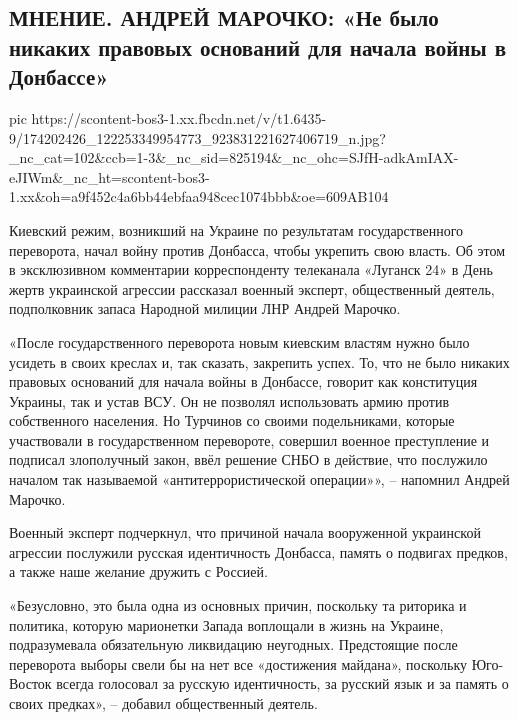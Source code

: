  
 
 
 
 

\subsection{МНЕНИЕ. АНДРЕЙ МАРОЧКО: «Не было никаких правовых оснований для начала войны в Донбассе»  }

\ifcmt
  pic https://scontent-bos3-1.xx.fbcdn.net/v/t1.6435-9/174202426_122253349954773_923831221627406719_n.jpg?_nc_cat=102&ccb=1-3&_nc_sid=825194&_nc_ohc=SJfH-adkAmIAX-eJIWm&_nc_ht=scontent-bos3-1.xx&oh=a9f452c4a6bb44ebfaa948cec1074bbb&oe=609AB104
\fi

Киевский режим, возникший на Украине по результатам государственного
переворота, начал войну против Донбасса, чтобы укрепить свою власть. Об этом в
эксклюзивном комментарии корреспонденту телеканала «Луганск 24» в День жертв
украинской агрессии рассказал военный эксперт, общественный деятель,
подполковник запаса Народной милиции ЛНР Андрей Марочко.

«После государственного переворота новым киевским властям нужно было усидеть в
своих креслах и, так сказать, закрепить успех. То, что не было никаких правовых
оснований для начала войны в Донбассе, говорит как конституция Украины, так и
устав ВСУ. Он не позволял использовать армию против собственного населения. Но
Турчинов со своими подельниками, которые участвовали в государственном
перевороте, совершил военное преступление и подписал злополучный закон, ввёл
решение СНБО в действие, что послужило началом так называемой
«антитеррористической операции»», – напомнил Андрей Марочко.

Военный эксперт подчеркнул, что причиной начала вооруженной украинской агрессии
послужили русская идентичность Донбасса, память о подвигах предков, а также
наше желание дружить с Россией.

«Безусловно, это была одна из основных причин, поскольку та риторика и
политика, которую марионетки Запада воплощали в жизнь на Украине, подразумевала
обязательную ликвидацию неугодных. Предстоящие после переворота выборы свели бы
на нет все «достижения майдана», поскольку Юго-Восток всегда голосовал за
русскую идентичность, за русский язык и за память о своих предках», – добавил
общественный деятель.

